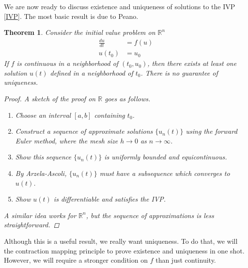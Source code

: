 \documentclass{article}
\newtheorem{theorem}{Theorem}[section]
\def\R{{\mathbb R}}
\begin{document}
We are now ready to discuss existence and uniqueness of solutions to the IVP \eqref{IVP}. The most basic result is due to Peano.


\begin{theorem}
Consider the initial value problem on $\R^n$
\begin{align}
\frac{du}{dt} &= f(u) \\
u(t_0) &= u_0 \nonumber
\end{align}
If $f$ is continuous in a neighborhood of $(t_0, u_0)$, then there exists at least one solution $u(t)$ defined in a neighborhood of $t_0$. There is no guarantee of uniqueness.
\begin{proof}
A sketch of the proof on $\R$ goes as follows.
\begin{enumerate}
	\item Choose an interval $[a, b]$ containing $t_0$.
	\item Construct a sequence of approximate solutions $\{ u_n(t) \}$ using the forward Euler method, where the mesh size $h \rightarrow 0$ as $n \rightarrow \infty$.
	\item Show this sequence $\{ u_n(t) \}$ is uniformly bounded and equicontinuous.
	\item By Arzela-Ascoli, $\{ u_n(t) \}$ must have a subsequence which converges to $u(t)$.
	\item Show $u(t)$ is differentiable and satisfies the IVP. 
\end{enumerate}
A similar idea works for $\R^n$, but the sequence of approximations is less straightforward.
\end{proof}
\end{theorem}

Although this is a useful result, we really want uniqueness. To do that, we will the contraction mapping principle to prove existence and uniqueness in one shot. However, we will require a stronger condition on $f$ than just continuity.

\end{document}
